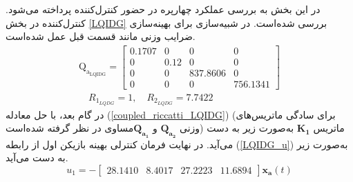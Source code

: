 \documentclass{CCI2020}
\begin{document}
	
	
	در این بخش به بررسی عملکرد چهارپره در حضور کنترل‌کننده  پرداخته می‌شود. کنترل‌کننده  در بخش
	\ref{LQIDG}
	بررسی شده‌است.
	در شبیه‌سازی برای بهینه‌سازی ضرایب وزنی مانند قسمت قبل عمل شده‌است.
	\begin{equation}
		\begin{split}
					\boldsymbol{\mathrm{Q_{a_{\text{LQIDG}}}}} = \begin{bmatrix}
				0.1707 &0& 0& 0\\
				0 &  0.12 & 0 &0 \\
				0 & 0 & 837.8606 & 0\\
				0 & 0 & 0 & 756.1341
			\end{bmatrix}\\ \quad R_{1_{LQDG}} =  1, \quad R_{2_{LQDG}} =  7.7422
		\end{split}
	\end{equation}
	در گام بعد، با حل معادله
	(\ref{coupled_riccatti_LQIDG})
	(برای سادگی ماتریس‌های وزنی $\boldsymbol{{Q}_{a_2}}$ و $\boldsymbol{{Q}_{a_1}}$مساوی در نظر گرفته شده‌است)
	ماتریس
	$\boldsymbol{{K}_1}$
	به‌صورت زیر به دست می‌آید.
	در نهایت فرمان کنترلی بهینه بازیکن اول از رابطه
	(\ref{LQIDG_u})
	به‌صورت زیر به دست می‌آید.
	\begin{equation}
		u_1 = -\begin{bmatrix}
			28.1410 &   8.4017  & 27.2223  & 11.6894
		\end{bmatrix}\boldsymbol{x_{a}}(t)
	\end{equation}
	
\end{document}
